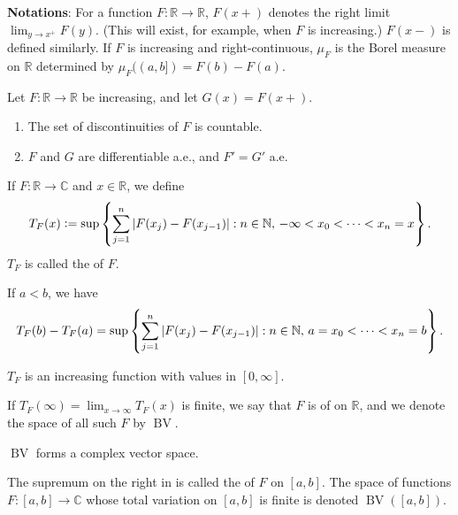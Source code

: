 \documentclass[12pt]{article}	%
\DeclareMathOperator{\BV}{BV}
\begin{document}
\textbf{Notations}: For a function $F : \mathbb{R} \to \mathbb{R}$, $F(x+)$ denotes the right limit $\lim_{y \to x^{+}} F(y)$. (This will exist, for example, when $F$ is increasing.) $F(x-)$ is defined similarly. \newline
If $F$ is increasing and right-continuous, $\mu_{F}$ is the Borel measure on $\mathbb{R}$ determined by $\mu_{F}((a, b]) = F(b) - F(a)$.

\begin{thm}
	Let $F : \mathbb{R} \to \mathbb{R}$ be increasing, and let $G(x) = F(x+)$. 
	\begin{enumerate}
		\item The set of discontinuities of $F$ is countable.
		\item $F$ and $G$ are differentiable a.e., and $F' = G'$ a.e.
	\end{enumerate}
\end{thm}

\begin{defn}
	If $F : \mathbb{R} \to \mathbb{C}$ and $x \in \mathbb{R}$, we define
	\begin{equation*} 
		T_{F}(x) \vcentcolon= \sup \left\{\sum_{j = 1}^{n} {\left\lvert F(x_{j}) - F(x_{j - 1}) \right\lvert} : n \in \mathbb{N},\, -\infty < x_{0} < \cdots < x_{n} = x\right\}.
	\end{equation*}
	$T_{F}$ is called the  of $F$.
\end{defn}

If $a < b$, we have
\begin{equation} \label{eq:005}
	T_{F}(b) - T_{F}(a) = \sup\left\{\sum_{j = 1}^{n} {\left\lvert F(x_{j}) - F(x_{j - 1}) \right\lvert} : n \in \mathbb{N},\, a = x_{0} < \cdots < x_{n} = b\right\}.
\end{equation}

$T_{F}$ is an increasing function with values in $[0, \infty]$. 

\begin{defn}
	If $T_{F}(\infty) = \lim_{x \to \infty} T_{F}(x)$ is finite, we say that $F$ is of  on $\mathbb{R}$, and we denote the space of all such $F$ by $\BV$.
\end{defn}

$\BV$ forms a complex vector space.

The supremum on the right in  is called the  of $F$ on $[a, b]$. The space of functions $F : [a, b] \to \mathbb{C}$ whose total variation on $[a, b]$ is finite is denoted $\BV([a, b])$.
\end{document}
